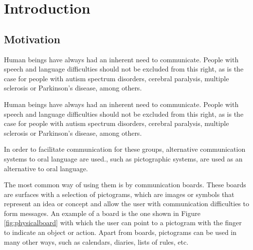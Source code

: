\chapter{Introduction}
\label{cap:introduction}



\section{Motivation}
\label{cap1:sec:Motivation}

Human beings have always had an inherent need to communicate. People with speech and language difficulties should not be excluded from this right, as is the case for people with autism spectrum disorders, cerebral paralysis, multiple sclerosis or Parkinson's disease, among others. 

Human beings have always had an inherent need to communicate. People with speech and language difficulties should not be excluded from this right, as is the case for people with autism spectrum disorders, cerebral paralysis, multiple sclerosis or Parkinson's disease, among others. 

In order to facilitate communication for these groups, alternative communication systems to oral language are used., such as pictographic systems, are used as an alternative to oral language.

The most common way of using them is by communication boards. These boards are surfaces with a selection of pictograms, which are images or symbols that represent an idea or concept and allow the user with communication difficulties to form messages. An example of a board is the one shown in Figure \ref{fig:physicalboard} with which the user can point to a pictogram with the finger to indicate an object or action. Apart from boards, pictograms can be used in many other ways, such as calendars, diaries, lists of rules, etc.


